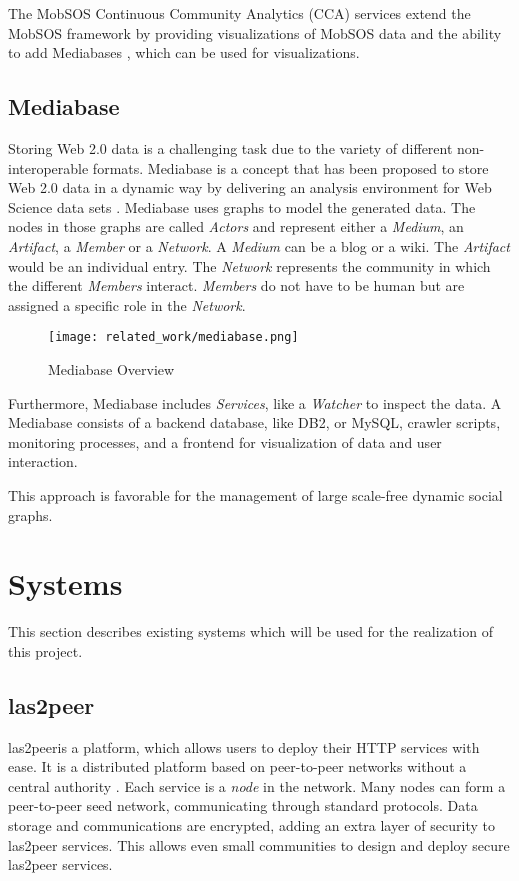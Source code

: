 The MobSOS Continuous Community Analytics (CCA) services extend the MobSOS framework by providing visualizations of MobSOS data and the ability to add Mediabases \cite{Kers20}, which can be used for visualizations.

\subsection{Mediabase}
Storing Web 2.0 data is a challenging task due to the variety of different non-interoperable formats.
Mediabase is a concept that has been proposed to store Web 2.0 data in a dynamic way by delivering an analysis environment for Web Science data sets \cite{KlPe08}.
Mediabase uses graphs to model the generated data.
The nodes in those graphs are called \emph{Actors} and represent either a \emph{ Medium}, an \emph{Artifact}, a \emph{Member} or a \emph{Network}.
A \emph{ Medium} can be a blog or a wiki.
The \emph{Artifact} would be an individual entry.
The \emph{Network} represents the community in which the different \emph{Members} interact.
\emph{Members} do not have to be human but are assigned a specific role in the \emph{Network}.
\begin{figure}[h]
    \centering
    \texttt{[image: related\_work/mediabase.png]}
    \caption{Mediabase Overview \cite{Klam10e}}
\end{figure}
Furthermore, Mediabase includes \emph{Services}, like a \emph{Watcher} to inspect the data.
A Mediabase consists of a backend database, like DB2, or MySQL, crawler scripts, monitoring processes, and a frontend for visualization of data and user interaction.

This approach is favorable for the management of large scale-free dynamic social graphs.

\section{Systems} \label{lab:systems}
This section describes existing systems which will be used for the realization of this project.

\subsection{las2peer}
las2peer\footnotemark is a platform, which allows users to deploy their HTTP services with ease. 
It is a distributed platform based on peer-to-peer networks without a central authority \cite{KRdJ16}.
Each service is a \emph{node} in the network. Many nodes can form a peer-to-peer seed network, communicating through standard protocols. 
Data storage and communications are encrypted, adding an extra layer of security to las2peer services.
This allows even small communities to design and deploy secure las2peer services. 

